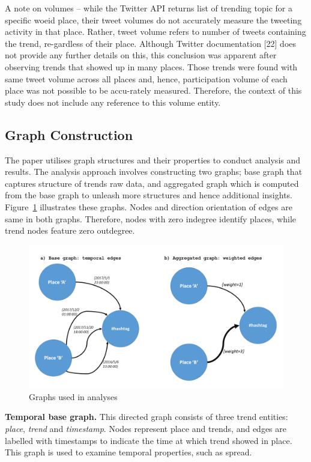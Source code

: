 \documentclass{llncs}
\begin{document}
A note on volumes -- while the Twitter API returns list of trending
topic for a specific woeid place, their tweet volumes do not
accurately measure the tweeting activity in that place. Rather, tweet
volume refers to number of tweets containing the trend, re-gardless of
their place. Although Twitter documentation [22] does not provide any
further details on this, this conclusion was apparent after observing
trends that showed up in many places. Those trends were found with
same tweet volume across all places and, hence, participation volume
of each place was not possible to be accu-rately measured. Therefore,
the context of this study does not include any reference to this
volume entity.

\subsection{Graph Construction}

The paper utilises graph structures and their properties to conduct
analysis and results. The analysis approach involves constructing two
graphs; base graph that captures structure of trends raw data, and
aggregated graph which is computed from the base graph to unleash more
structures and hence additional
insights. Figure~\ref{fig:graphexamples} illustrates these
graphs. Nodes and direction orientation of edges are same in both
graphs. Therefore, nodes with zero indegree identify places, while
trend nodes feature zero outdegree.

\begin{figure}[htb]
\centering
\includegraphics[width=\columnwidth]{images/graphexamples.png}
\caption{Graphs used in analyses}
\label{fig:graphexamples}
\end{figure}

{\textbf{Temporal base graph.}} This directed graph consists of three
trend entities: {\emph{place}}, {\emph{trend}} and
{\emph{timestamp}}. Nodes represent place and trends, and edges are
labelled with timestamps to indicate the time at which trend showed in
place. This graph is used to examine temporal properties, such as
spread.
\end{document}
